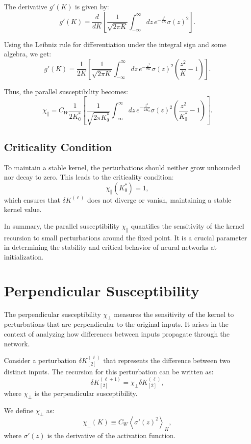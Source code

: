 \documentclass{article}
\begin{document}
The derivative $g'(K)$ is given by:
\[
g'(K) = \frac{d}{dK} \left[ \frac{1}{\sqrt{2\pi K}} \int_{-\infty}^{\infty} dz \, e^{-\frac{z^2}{2K}} \sigma(z)^2 \right].
\]

Using the Leibniz rule for differentiation under the integral sign and some algebra, we get:
\[
g'(K) = \frac{1}{2K} \left[ \frac{1}{\sqrt{2\pi K}} \int_{-\infty}^{\infty} dz \, e^{-\frac{z^2}{2K}} \sigma(z)^2 \left( \frac{z^2}{K} - 1 \right) \right].
\]

Thus, the parallel susceptibility becomes:
\[
\chi_{\parallel} = C_W \frac{1}{2K_0^*} \left[ \frac{1}{\sqrt{2\pi K_0^*}} \int_{-\infty}^{\infty} dz \, e^{-\frac{z^2}{2K_0^*}} \sigma(z)^2 \left( \frac{z^2}{K_0^*} - 1 \right) \right].
\]

\subsection*{Criticality Condition}

To maintain a stable kernel, the perturbations should neither grow unbounded nor decay to zero. This leads to the criticality condition:
\[
\chi_{\parallel}(K_0^*) = 1,
\]
which ensures that $\delta K^{(\ell)}$ does not diverge or vanish, maintaining a stable kernel value.

In summary, the parallel susceptibility $\chi_{\parallel}$ quantifies the sensitivity of the kernel recursion to small perturbations around the fixed point. It is a crucial parameter in determining the stability and critical behavior of neural networks at initialization.

\section{Perpendicular Susceptibility}

The perpendicular susceptibility $\chi_{\perp}$ measures the sensitivity of the kernel to perturbations that are perpendicular to the original inputs. It arises in the context of analyzing how differences between inputs propagate through the network.

Consider a perturbation $\delta K_{[2]}^{(\ell)}$ that represents the difference between two distinct inputs. The recursion for this perturbation can be written as:
\[
\delta K_{[2]}^{(\ell + 1)} = \chi_{\perp} \delta K_{[2]}^{(\ell)},
\]
where $\chi_{\perp}$ is the perpendicular susceptibility.

We define $\chi_{\perp}$ as:
\[
\chi_{\perp}(K) \equiv C_W \left\langle \sigma'(z)^2 \right\rangle_{K},
\]
where $\sigma'(z)$ is the derivative of the activation function.
\end{document}
